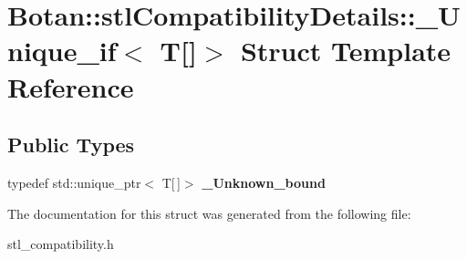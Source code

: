 \hypertarget{struct_botan_1_1stl_compatibility_details_1_1___unique__if_3_01_t[]_4}{}\section{Botan\+:\+:stl\+Compatibility\+Details\+:\+:\+\_\+\+Unique\+\_\+if$<$ T\mbox{[}\mbox{]}$>$ Struct Template Reference}
\label{struct_botan_1_1stl_compatibility_details_1_1___unique__if_3_01_t[]_4}
\subsection*{Public Types}
\begin{DoxyCompactItemize}
\item 
\mbox{\label{struct_botan_1_1stl_compatibility_details_1_1___unique__if_3_01_t[]_4_a9beb941851e81132a571db19c7d79266}} 
typedef std\+::unique\+\_\+ptr$<$ T\mbox{[}$\,$\mbox{]}$>$ {\bfseries \+\_\+\+Unknown\+\_\+bound}
\end{DoxyCompactItemize}


The documentation for this struct was generated from the following file\+:\begin{DoxyCompactItemize}
\item 
stl\+\_\+compatibility.\+h\end{DoxyCompactItemize}
